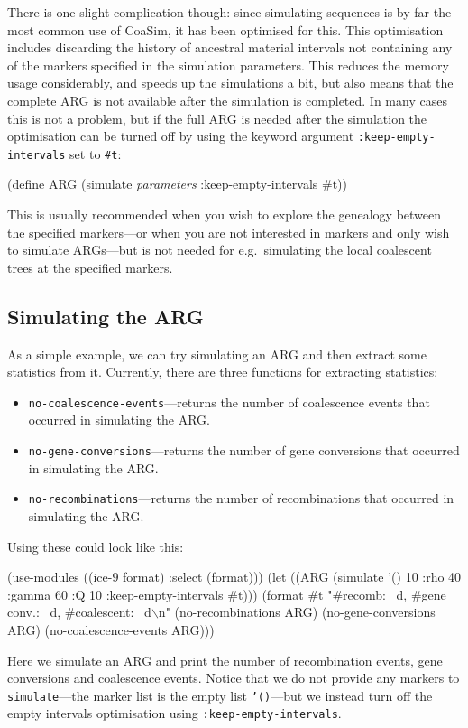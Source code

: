 \documentclass{manual}
\begin{document}
There is one slight complication though: since simulating sequences is
by far the most common use of CoaSim, it has been optimised for this.
This optimisation includes discarding the history of ancestral
material intervals not containing any of the markers specified in the
simulation parameters.  This reduces the memory usage considerably,
and speeds up the simulations a bit, but also means that the complete
ARG is not available after the simulation is completed.  In many cases
this is not a problem, but if the full ARG is needed after the
simulation the optimisation can be turned off by using the keyword
argument \texttt{:keep-empty-intervals} set to \texttt{\#t}:

\begin{code}
(define ARG (simulate \emph{parameters} :keep-empty-intervals \#t))
\end{code}

This is usually recommended when you wish to explore the genealogy
between the specified markers---or when you are not interested in
markers and only wish to simulate ARGs---but is not needed for e.g.\
simulating the local coalescent trees at the specified markers.


\subsection{Simulating the ARG}
\label{sec:simulating-arg}

As a simple example, we can try simulating an ARG and then extract
some statistics from it.  Currently, there are three functions for
extracting statistics:
\begin{itemize}
\item \texttt{no-coalescence-events}---returns the number of
  coalescence events that occurred in simulating the ARG.
\item \texttt{no-gene-conversions}---returns the number of gene
  conversions that occurred in simulating the ARG.
\item \texttt{no-recombinations}---returns the number of
  recombinations that occurred in simulating the ARG.
\end{itemize}

Using these could look like this:
\begin{code}
(use-modules ((ice-9 format) :select (format)))
(let ((ARG (simulate '() 10
                     :rho 40 :gamma 60 :Q 10
                     :keep-empty-intervals \#t)))
  (format #t "#recomb: ~d, #gene conv.: ~d, #coalescent: ~d\(\backslash\)n"
          (no-recombinations     ARG)
          (no-gene-conversions   ARG)
          (no-coalescence-events ARG)))  
\end{code}
Here we simulate an ARG and print the number of recombination events,
gene conversions and coalescence events.  Notice that we do not
provide any markers to \texttt{simulate}---the marker list is the
empty list \texttt{'()}---but we instead turn off the empty intervals
optimisation using \texttt{:keep-empty-intervals}.
\end{document}
